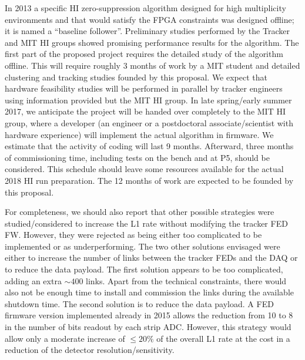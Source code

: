 In 2013 a specific HI zero-suppression algorithm designed for high multiplicity environments and that would satisfy the FPGA constraints was designed offline; it is named a ``baseline follower''.  Preliminary studies performed by the Tracker and MIT HI groups showed promising performance results for the algorithm. The first part of the proposed project requires the detailed study of the algorithm offline. This will require roughly 3 months of work by a MIT student and detailed clustering and tracking studies founded by this proposal. We expect that hardware feasibility studies will be performed in parallel by tracker engineers using information provided but the MIT HI group. In late spring/early summer 2017, we anticipate the project will be handed over completely to the MIT HI group, where a developer (an engineer or a postdoctoral associate/scientist with hardware experience) will implement the actual algorithm in firmware. We estimate that the activity of coding will last 9 months. Afterward, three months of commissioning time, including tests on the bench and at P5, should be considered. This schedule should leave some resources available for the actual 2018 HI run preparation. The 12 months of work are expected to be founded by this proposal.

For completeness, we should also report that other possible strategies were studied/considered to increase the L1 rate without modifying the tracker FED FW. However, they were rejected as being either too complicated to be implemented or as underperforming. The two other solutions envisaged were either to increase the number of links between the tracker FEDs and the DAQ or to reduce the data payload. The first solution appears to be too complicated, adding an extra $\sim 400$ links. Apart from the technical constraints, there would also not be enough time to install and commission the links during the available shutdown time. The second solution is to reduce the data payload. A FED firmware version implemented already in 2015 allows the reduction from 10 to 8 in the number of bits readout by each strip ADC. However, this strategy would allow only a moderate increase of $\le 20 \%$ of the overall L1 rate at the cost in a reduction of the detector resolution/sensitivity. 
